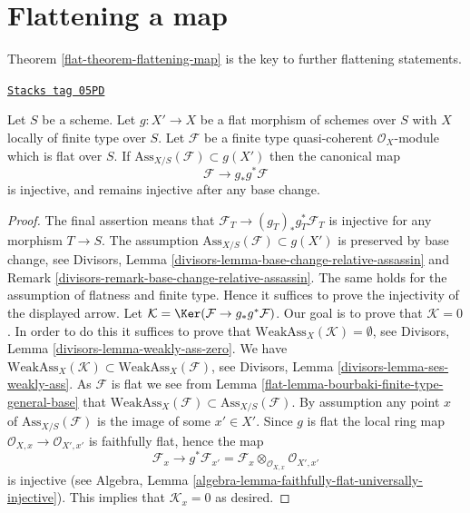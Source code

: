 \section{Flattening a map}
\label{flat-section-flattening-map}
Theorem \ref{flat-theorem-flattening-map}
is the key to further flattening statements.

\begin{lemma}
\label{flat-lemma-universally-separating}
\href{https://stacks.math.columbia.edu/tag/05PD}{\texttt{Stacks tag 05PD}}

Let $S$ be a scheme.
Let $g : X' \to X$ be a flat morphism of schemes over $S$
with $X$ locally of finite type over $S$.
Let $\mathcal{F}$ be a finite type quasi-coherent $\mathcal{O}_X$-module
which is flat over $S$. If $\text{Ass}_{X/S}(\mathcal{F}) \subset g(X')$
then the canonical map
$$
\mathcal{F} \longrightarrow g_*g^*\mathcal{F}
$$
is injective, and remains injective after any base change.
\end{lemma}

\begin{proof}

The final assertion means that $\mathcal{F}_T \to (g_T)_*g_T^*\mathcal{F}_T$
is injective for any morphism $T \to S$. The assumption
$\text{Ass}_{X/S}(\mathcal{F}) \subset g(X')$ is preserved by base change, see
Divisors, Lemma \ref{divisors-lemma-base-change-relative-assassin} and
Remark \ref{divisors-remark-base-change-relative-assassin}.
The same holds for the assumption of flatness and finite type.
Hence it suffices to prove the injectivity of the displayed arrow.
Let $\mathcal{K} = \Ker(\mathcal{F} \to g_*g^*\mathcal{F})$.
Our goal is to prove that $\mathcal{K} = 0$.
In order to do this it suffices to prove that
$\text{WeakAss}_X(\mathcal{K}) = \emptyset$, see
Divisors, Lemma \ref{divisors-lemma-weakly-ass-zero}.
We have
$\text{WeakAss}_X(\mathcal{K}) \subset \text{WeakAss}_X(\mathcal{F})$, see
Divisors, Lemma \ref{divisors-lemma-ses-weakly-ass}.
As $\mathcal{F}$ is flat we see from
Lemma \ref{flat-lemma-bourbaki-finite-type-general-base}
that $\text{WeakAss}_X(\mathcal{F}) \subset \text{Ass}_{X/S}(\mathcal{F})$.
By assumption any point $x$ of $\text{Ass}_{X/S}(\mathcal{F})$
is the image of some $x' \in X'$. Since $g$ is flat the
local ring map $\mathcal{O}_{X, x} \to \mathcal{O}_{X', x'}$
is faithfully flat, hence the map
$$
\mathcal{F}_x
\longrightarrow
g^*\mathcal{F}_{x'} =
\mathcal{F}_x \otimes_{\mathcal{O}_{X, x}} \mathcal{O}_{X', x'}
$$
is injective (see
Algebra, Lemma \ref{algebra-lemma-faithfully-flat-universally-injective}).
This implies that $\mathcal{K}_x = 0$ as desired.
\end{proof}

